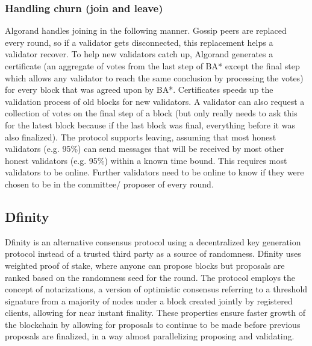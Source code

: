 \documentclass[10pt,journal,compsoc]{IEEEtran}
\begin{document}
\subsubsection{Handling churn (join and leave)}
Algorand handles joining in the following manner. Gossip peers are replaced every round, so if a validator gets disconnected, this replacement helps a validator recover. To help new validators catch up, Algorand generates a certificate (an aggregate of votes from the last step of BA* except the final step which allows any validator to reach the same conclusion by processing the votes) for every block that was agreed upon by BA*. Certificates speeds up the validation process of old blocks for new validators. A validator can also request a collection of votes on the final step of a block (but only really needs to ask this for the latest block because if the last block was final, everything before it was also finalized). The protocol supports leaving, assuming that most honest validators (e.g. 95\%) can send messages that will be received by most other honest validators (e.g. 95\%) within a known time bound. This requires most validators to be online. Further validators need to be online to know if they were chosen to be in the committee/ proposer of every round.

\subsection{Dfinity}

Dfinity \cite{Dfinity} is an alternative consensus protocol using a decentralized key generation protocol instead of a trusted third party as a source of randomness. Dfinity uses weighted proof of stake, where anyone can propose blocks but proposals are ranked based on the randomness seed for the round. The protocol employs the concept of notarizations, a version of optimistic consensus referring to a threshold signature from a majority of nodes under a block created jointly by registered clients, allowing for near instant finality. These properties ensure faster growth of the blockchain by allowing for proposals to continue to be made before previous proposals are finalized, in a way almost parallelizing proposing and validating. 
\end{document}
